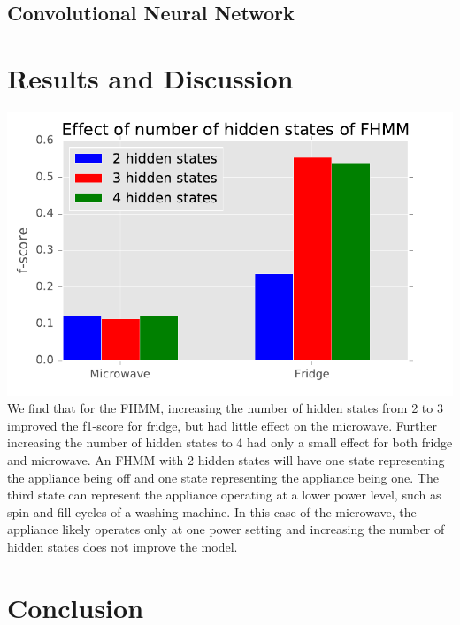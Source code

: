 \documentclass[11pt]{article}
\begin{document}
\subsection{Convolutional Neural Network}

\section{Results and Discussion}
\includegraphics[width=0.4\paperwidth]{../figures/num_states.pdf}\\
We find that for the FHMM, increasing the number of hidden states from 2 to 3 improved the f1-score for fridge, but had little effect on the microwave. Further increasing the number of hidden states to 4 had only a small effect for both fridge and microwave. An FHMM with 2 hidden states will have one state representing the appliance being off and one state representing the appliance being one. The third state can represent the appliance operating at a lower power level, such as spin and fill cycles of a washing machine. In this case of the microwave, the appliance likely operates only at one power setting and increasing the number of hidden states does not improve the model. 

\section{Conclusion}





\end{document}
